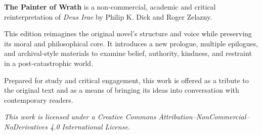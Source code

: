 \cleardoublepage
\thispagestyle{empty}
\pagestyle{empty}

{}

\null
\vfill

\noindent\hspace*{0.12\textwidth}%
\parbox{0.76\textwidth}{
\textbf{The Painter of Wrath} is a non-commercial, academic and
critical reinterpretation of \emph{Deus Irae} by Philip K. Dick
and Roger Zelazny.

\bigskip

This edition reimagines the original novel’s structure and voice
while preserving its moral and philosophical core. It introduces
a new prologue, multiple epilogues, and archival-style materials
to examine belief, authority, kindness, and restraint in a
post-catastrophic world.

\bigskip

Prepared for study and critical engagement, this work is offered
as a tribute to the original text and as a means of bringing its
ideas into conversation with contemporary readers.

\bigskip

\textit{This work is licensed under a Creative Commons Attribution--NonCommercial--NoDerivatives 4.0 International License.}
}

\vfill
\null

\clearpage
